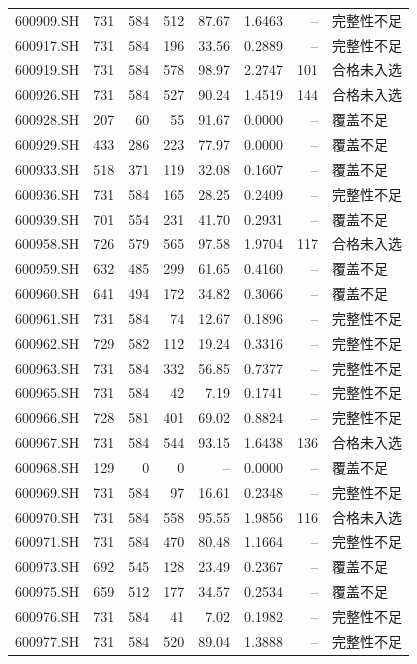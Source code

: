 \documentclass[10pt,a4paper]{article}
\begin{document}
\begin{longtable}{lrrr r r r l}
600909.SH & 731 & 584 & 512 & 87.67 & 1.6463 & -- & 完整性不足\\
600917.SH & 731 & 584 & 196 & 33.56 & 0.2889 & -- & 完整性不足\\
600919.SH & 731 & 584 & 578 & 98.97 & 2.2747 & 101 & 合格未入选\\
600926.SH & 731 & 584 & 527 & 90.24 & 1.4519 & 144 & 合格未入选\\
600928.SH & 207 & 60 & 55 & 91.67 & 0.0000 & -- & 覆盖不足\\
600929.SH & 433 & 286 & 223 & 77.97 & 0.0000 & -- & 覆盖不足\\
600933.SH & 518 & 371 & 119 & 32.08 & 0.1607 & -- & 覆盖不足\\
600936.SH & 731 & 584 & 165 & 28.25 & 0.2409 & -- & 完整性不足\\
600939.SH & 701 & 554 & 231 & 41.70 & 0.2931 & -- & 覆盖不足\\
600958.SH & 726 & 579 & 565 & 97.58 & 1.9704 & 117 & 合格未入选\\
600959.SH & 632 & 485 & 299 & 61.65 & 0.4160 & -- & 覆盖不足\\
600960.SH & 641 & 494 & 172 & 34.82 & 0.3066 & -- & 覆盖不足\\
600961.SH & 731 & 584 & 74 & 12.67 & 0.1896 & -- & 完整性不足\\
600962.SH & 729 & 582 & 112 & 19.24 & 0.3316 & -- & 完整性不足\\
600963.SH & 731 & 584 & 332 & 56.85 & 0.7377 & -- & 完整性不足\\
600965.SH & 731 & 584 & 42 & 7.19 & 0.1741 & -- & 完整性不足\\
600966.SH & 728 & 581 & 401 & 69.02 & 0.8824 & -- & 完整性不足\\
600967.SH & 731 & 584 & 544 & 93.15 & 1.6438 & 136 & 合格未入选\\
600968.SH & 129 & 0 & 0 & -- & 0.0000 & -- & 覆盖不足\\
600969.SH & 731 & 584 & 97 & 16.61 & 0.2348 & -- & 完整性不足\\
600970.SH & 731 & 584 & 558 & 95.55 & 1.9856 & 116 & 合格未入选\\
600971.SH & 731 & 584 & 470 & 80.48 & 1.1664 & -- & 完整性不足\\
600973.SH & 692 & 545 & 128 & 23.49 & 0.2367 & -- & 覆盖不足\\
600975.SH & 659 & 512 & 177 & 34.57 & 0.2534 & -- & 覆盖不足\\
600976.SH & 731 & 584 & 41 & 7.02 & 0.1982 & -- & 完整性不足\\
600977.SH & 731 & 584 & 520 & 89.04 & 1.3888 & -- & 完整性不足\\

\end{longtable}
\end{document}
